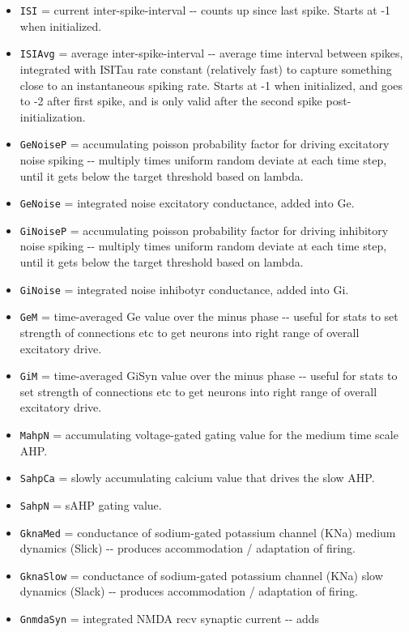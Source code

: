 \documentclass[11pt,twoside]{article}
\newif\myifpdf
\begin{document}
\begin{itemize}
\item
  \texttt{ISI} = current inter-spike-interval -\/- counts up since last
  spike. Starts at -1 when initialized.
\item
  \texttt{ISIAvg} = average inter-spike-interval -\/- average time
  interval between spikes, integrated with ISITau rate constant
  (relatively fast) to capture something close to an instantaneous
  spiking rate. Starts at -1 when initialized, and goes to -2 after
  first spike, and is only valid after the second spike
  post-initialization.
\item
  \texttt{GeNoiseP} = accumulating poisson probability factor for
  driving excitatory noise spiking -\/- multiply times uniform random
  deviate at each time step, until it gets below the target threshold
  based on lambda.
\item
  \texttt{GeNoise} = integrated noise excitatory conductance, added into
  Ge.
\item
  \texttt{GiNoiseP} = accumulating poisson probability factor for
  driving inhibitory noise spiking -\/- multiply times uniform random
  deviate at each time step, until it gets below the target threshold
  based on lambda.
\item
  \texttt{GiNoise} = integrated noise inhibotyr conductance, added into
  Gi.
\item
  \texttt{GeM} = time-averaged Ge value over the minus phase -\/- useful
  for stats to set strength of connections etc to get neurons into right
  range of overall excitatory drive.
\item
  \texttt{GiM} = time-averaged GiSyn value over the minus phase -\/-
  useful for stats to set strength of connections etc to get neurons
  into right range of overall excitatory drive.
\item
  \texttt{MahpN} = accumulating voltage-gated gating value for the
  medium time scale AHP.
\item
  \texttt{SahpCa} = slowly accumulating calcium value that drives the
  slow AHP.
\item
  \texttt{SahpN} = sAHP gating value.
\item
  \texttt{GknaMed} = conductance of sodium-gated potassium channel (KNa)
  medium dynamics (Slick) -\/- produces accommodation / adaptation of
  firing.
\item
  \texttt{GknaSlow} = conductance of sodium-gated potassium channel
  (KNa) slow dynamics (Slack) -\/- produces accommodation / adaptation
  of firing.
\item
  \texttt{GnmdaSyn} = integrated NMDA recv synaptic current -\/- adds

\end{itemize}
\end{document}
